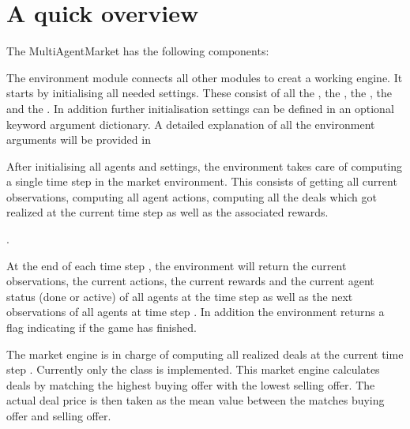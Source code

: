 \documentclass[letterpaper,10pt,english]{sphinxmanual}
\begin{document}
\section{A quick overview}
\label{\detokenize{MultiAgentMarketRL:a-quick-overview}}
\sphinxAtStartPar
The Multi\sphinxhyphen{}Agent\sphinxhyphen{}Market has the following components:

\sphinxAtStartPar
{}

\sphinxAtStartPar
The environment module connects all other modules to creat a working engine. It starts by initialising all needed
settings. These consist of all the , the , the , the  and the
. In addition further initialisation settings can be defined in an optional keyword argument dictionary.
A detailed explanation of all the environment arguments will be provided in

\sphinxAtStartPar
After initialising all agents and settings, the environment takes care of computing a single time step in the market
environment. This consists of getting all current observations, computing all agent actions, computing all the deals
which got realized at the current time step  as well as the associated rewards.

\sphinxAtStartPar
{}.

\sphinxAtStartPar
At the end of each time step , the environment will return the current observations, the
current actions, the current rewards and the current agent status (done or active) of all agents at the time step
 as well as the next observations of all agents at time step . In addition the environment returns a flag
indicating if the game has finished.

\sphinxAtStartPar
{}

\sphinxAtStartPar
The market engine is in charge of computing all realized deals at the current time step .
Currently only the  class is implemented. This market engine calculates deals by matching the
highest buying offer with the lowest selling offer. The actual deal price is then taken as the mean value between the
matches buying offer and selling offer.
\end{document}
